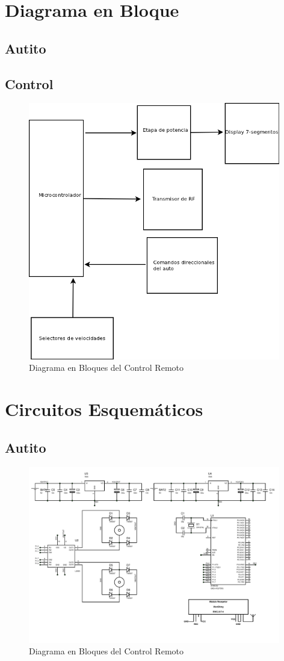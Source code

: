 \documentclass[a4paper,10pt]{article}
\begin{document}
		
	\section{Diagrama en Bloque}
		\subsection{Autito}
		\subsection{Control}
			
			\begin{figure}[!htb]
				\centering
				\includegraphics[width=11cm]{Imagenes/Diagrama1.png}
				\caption{Diagrama en Bloques del Control Remoto} \label{limg001}
			\end{figure}

	\section{Circuitos Esquemáticos}
		\subsection{Autito}
			\begin{figure}[!htb]
				\centering
				\includegraphics[width=11cm]{Imagenes/EsquematicoAuto.PDF}
				\caption{Diagrama en Bloques del Control Remoto} \label{limg003}
			\end{figure}
		
\end{document}
